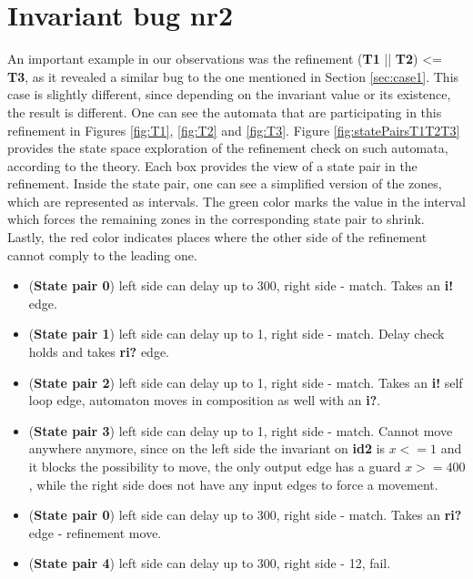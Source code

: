 \section{Invariant bug nr2}\label{sec:invBug}
An important example in our observations was the refinement (\textbf{T1} || \textbf{T2}) <= \textbf{T3}, as it revealed a similar bug to the one mentioned in Section \ref{sec:case1}. This case is slightly different, since depending on the invariant value or its existence, the result is different. One can see the automata that are participating in this refinement in Figures \ref{fig:T1}, \ref{fig:T2} and \ref{fig:T3}. Figure \ref{fig:statePairsT1T2T3} provides the state space exploration of the refinement check on such automata, according to the theory. Each box provides the view of a state pair in the refinement. Inside the state pair, one can see a simplified version of the zones, which are represented as intervals. The green color marks the value in the interval which forces the remaining zones in the corresponding state pair to shrink. Lastly, the red color indicates places where the other side of the refinement cannot comply to the leading one.
 
\begin{itemize}
    \item (\textbf{State pair 0}) left side can delay up to 300, right side - match. Takes an \textbf{i!} edge.
    \item (\textbf{State pair 1}) left side can delay up to 1, right side - match. Delay check holds and takes \textbf{ri?} edge.
    \item (\textbf{State pair 2}) left side can delay up to 1, right side - match. Takes an \textbf{i!} self loop edge, automaton moves in composition as well with an \textbf{i?}.
    \item (\textbf{State pair 3}) left side can delay up to 1, right side - match. Cannot move anywhere anymore, since on the left side the invariant on \textbf{id2} is $x<=1$ and it blocks the possibility to move, the only output edge has a guard $x>=400$, while the right side does not have any input edges to force a movement.
    \item (\textbf{State pair 0}) left side can delay up to 300, right side - match. Takes an \textbf{ri?} edge - refinement move.
    \item (\textbf{State pair 4}) left side can delay up to 300, right side - 12, fail.
\end{itemize}


